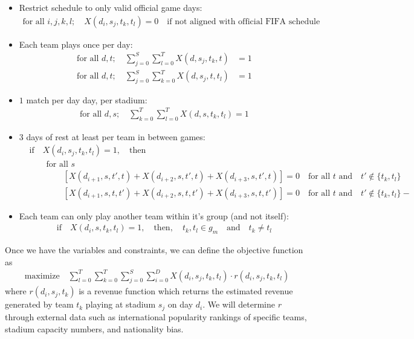 \documentclass[letterpaper,10pt]{article}
\begin{document}
\begin{itemize}
\item Restrict schedule to only valid official game days:
\begin{align*}
\text{for all $i,j,k,l$}; \quad X(d_i, s_j, t_k, t_l) = 0 \quad \text{if not aligned with official FIFA schedule}
\end{align*}
\item Each team plays once per day:
\begin{align*}
\text{for all $d,t$}; \quad \sum_{j = 0}^S \sum_{l = 0}^T X(d, s_j, t_k, t) &= 1 \\
\text{for all $d,t$}; \quad \sum_{j = 0}^S \sum_{k = 0}^T X(d, s_j, t, t_l) &= 1
\end{align*}
\item $1$ match per day day, per stadium:
\begin{align*}
\text{for all $d,s$}; \quad \sum_{k = 0}^T \sum_{l = 0}^T X(d, s, t_k, t_l) = 1
\end{align*}
\item $3$ days of rest at least per team in between games:
\begin{align*}
&\text{if} \quad X(d_i, s_j, t_k, t_l) = 1, \quad \text{then} \\
&\qquad \text{for all $s$} \\
&\qquad \qquad \left[ X(d_{i + 1}, s, t', t) + X(d_{i + 2}, s, t', t) + X(d_{i + 3}, s, t', t)\right] = 0 \quad \text{for all $t$ and} \quad t' \not\in \{t_k, t_l \} \\
&\qquad \qquad \left[ X(d_{i + 1}, s, t, t') + X(d_{i + 2}, s, t, t') + X(d_{i + 3}, s, t, t')\right] = 0 \quad \text{for all $t$ and} \quad t' \not\in \{t_k, t_l \}-
\end{align*}
\item Each team can only play another team within it's group (and not itself):
\begin{align*}
\text{if} \quad X(d_i, s, t_k, t_l) = 1, \quad \text{then}, \quad t_k, t_l \in g_m \quad \text{and} \quad t_k \neq t_l
\end{align*}
\end{itemize}
Once we have the variables and constraints, we can define the objective function as 
\begin{align*}
\text{maximize} \quad \sum_{l = 0}^T \sum_{k = 0}^T \sum_{j = 0}^S \sum_{i = 0}^D X(d_i, s_j, t_k, t_l) \cdot r(d_i, s_j, t_k, t_l)
\end{align*}
where $r(d_i, s_j, t_k)$ is a revenue function which returns the estimated revenue generated by team $t_k$ playing at stadium $s_j$ on day $d_i$. We will determine $r$ through external data such as international popularity rankings of specific teams, stadium capacity numbers, and nationality bias. 
\end{document}
